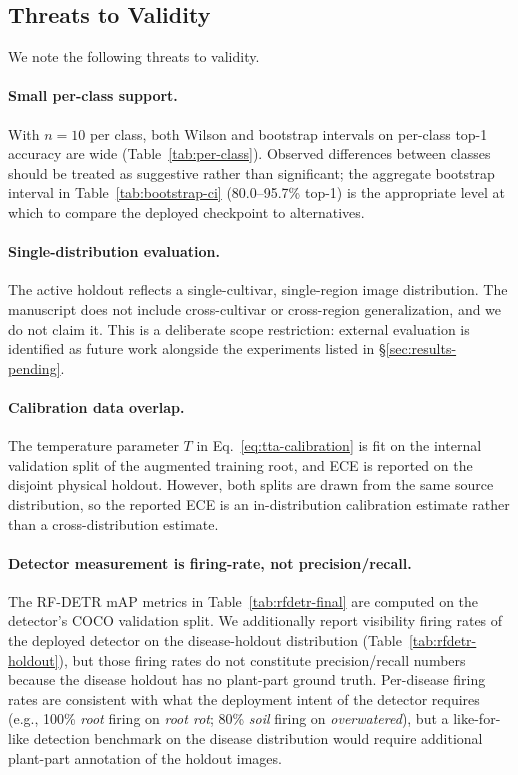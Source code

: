 \subsection{Threats to Validity}

We note the following threats to validity.

\paragraph{Small per-class support.}
With $n=10$ per class, both Wilson and bootstrap intervals on per-class
top-1 accuracy are wide (Table~\ref{tab:per-class}). Observed
differences between classes should be treated as suggestive rather than
significant; the aggregate bootstrap interval in
Table~\ref{tab:bootstrap-ci} (80.0--95.7\% top-1) is the appropriate
level at which to compare the deployed checkpoint to alternatives.

\paragraph{Single-distribution evaluation.}
The active holdout reflects a single-cultivar, single-region image
distribution. The manuscript does not include cross-cultivar or
cross-region generalization, and we do not claim it. This is a
deliberate scope restriction: external evaluation is identified as
future work alongside the experiments listed in
\S\ref{sec:results-pending}.

\paragraph{Calibration data overlap.}
The temperature parameter $T$ in Eq.~\ref{eq:tta-calibration} is fit on
the internal validation split of the augmented training root, and ECE
is reported on the disjoint physical holdout. However, both splits are
drawn from the same source distribution, so the reported ECE is an
in-distribution calibration estimate rather than a cross-distribution
estimate.

\paragraph{Detector measurement is firing-rate, not precision/recall.}
The RF-DETR mAP metrics in Table~\ref{tab:rfdetr-final} are computed on
the detector's COCO validation split. We additionally report visibility
firing rates of the deployed detector on the disease-holdout
distribution (Table~\ref{tab:rfdetr-holdout}), but those firing rates
do not constitute precision/recall numbers because the disease holdout
has no plant-part ground truth. Per-disease firing rates are consistent
with what the deployment intent of the detector requires (e.g., 100\%
\emph{root} firing on \emph{root rot}; 80\% \emph{soil} firing on
\emph{overwatered}), but a like-for-like detection benchmark on the
disease distribution would require additional plant-part annotation of
the holdout images.

